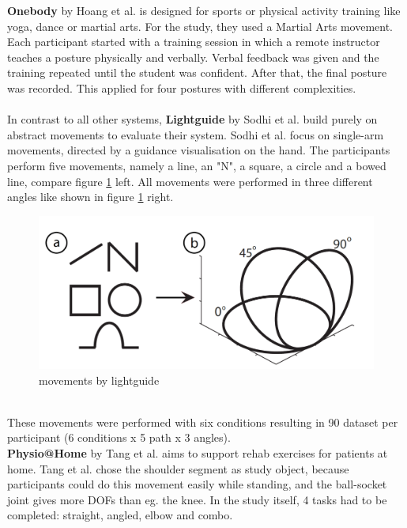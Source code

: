 \textbf{Onebody} by Hoang et al. \cite{Hoang2016} is designed for sports or physical activity training like yoga, dance or martial arts. For the study, they used a Martial Arts movement. Each participant started with a training session in which a remote instructor teaches a posture physically and verbally. Verbal feedback was given and the training repeated until the student was confident. After that, the final posture was recorded. This applied for four postures with different complexities.\\ \\
In contrast to all other systems, \textbf{Lightguide} by Sodhi et al. \cite{Sodhi2012} build purely on abstract movements to evaluate their system. Sodhi et al. focus on single-arm movements, directed by a guidance visualisation on the hand. The participants perform five movements, namely a line, an "N", a square, a circle and a bowed line, compare figure \ref{fig:lightguide1} left. All movements were performed in three different angles like shown in figure \ref{fig:lightguide1} right.
\begin{figure}
	\centering
	\includegraphics[width=1.0\textwidth]{img/lightguide_movements.PNG}
	\caption{movements by lightguide \cite{Sodhi2012}}
	\label{fig:lightguide1}
\end{figure}\\
These movements were performed with six conditions resulting in 90 dataset per participant (6 conditions x 5 path x 3 angles).\\
\textbf{Physio@Home} by Tang et al. \cite{Tang2015} aims to support rehab exercises for patients at home. Tang et al. chose the shoulder segment as study object, because participants could do this movement easily while standing, and the ball-socket joint gives more DOFs than eg. the knee. In the study itself, 4 tasks had to be completed: straight, angled, elbow and combo.

